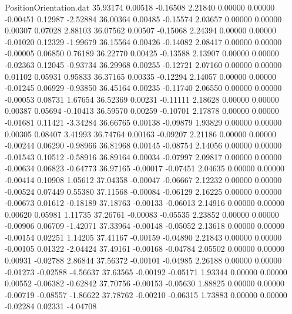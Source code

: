 \begin{filecontents}{PositionOrientation.dat}
  35.93174    0.00518   -0.16508     2.21840    0.00000    0.00000   -0.00451    0.12987   -2.52884
  36.00364    0.00485   -0.15574     2.03657    0.00000    0.00000    0.00307    0.07028    2.88103
  36.07562    0.00507   -0.15068     2.24394    0.00000    0.00000   -0.01020    0.12329   -1.99679
  36.15564    0.00426   -0.14082     2.08417    0.00000    0.00000   -0.00005    0.06850    0.76189
  36.22770    0.00425   -0.13588     2.13907    0.00000    0.00000   -0.02363    0.12045   -0.93734
  36.29968    0.00255   -0.12721     2.07160    0.00000    0.00000    0.01102    0.05931    0.95833
  36.37165    0.00335   -0.12294     2.14057    0.00000    0.00000   -0.01245    0.06929   -0.93850
  36.45164    0.00235   -0.11740     2.06550    0.00000    0.00000   -0.00053    0.08731    1.67654
  36.52369    0.00231   -0.11111     2.18628    0.00000    0.00000    0.00387    0.05694   -0.10413
  36.59570    0.00259   -0.10701     2.17878    0.00000    0.00000   -0.01681    0.11421   -3.34284
  36.66765    0.00138   -0.09879     1.93829    0.00000    0.00000    0.00305    0.08407    3.41993
  36.74764    0.00163   -0.09207     2.21186    0.00000    0.00000   -0.00244    0.06290   -0.98966
  36.81968    0.00145   -0.08754     2.14056    0.00000    0.00000   -0.01543    0.10512   -0.58916
  36.89164    0.00034   -0.07997     2.09817    0.00000    0.00000   -0.00634    0.06823   -0.64773
  36.97165   -0.00017   -0.07451     2.04635    0.00000    0.00000   -0.00414    0.10908    1.05612
  37.04358   -0.00047   -0.06667     2.12232    0.00000    0.00000   -0.00524    0.07449    0.55380
  37.11568   -0.00084   -0.06129     2.16225    0.00000    0.00000   -0.00673    0.01612   -0.18189
  37.18763   -0.00133   -0.06013     2.14916    0.00000    0.00000    0.00620    0.05981    1.11735
  37.26761   -0.00083   -0.05535     2.23852    0.00000    0.00000   -0.00906    0.06709   -1.42071
  37.33964   -0.00148   -0.05052     2.13618    0.00000    0.00000   -0.00154    0.02251    1.14205
  37.41167   -0.00159   -0.04890     2.21843    0.00000    0.00000   -0.00105    0.01322   -2.04424
  37.49161   -0.00168   -0.04784     2.05502    0.00000    0.00000    0.00931   -0.02788    2.86844
  37.56372   -0.00101   -0.04985     2.26188    0.00000    0.00000   -0.01273   -0.02588   -4.56637
  37.63565   -0.00192   -0.05171     1.93344    0.00000    0.00000    0.00552   -0.06382   -0.62842
  37.70756   -0.00153   -0.05630     1.88825    0.00000    0.00000   -0.00719   -0.08557   -1.86622
  37.78762   -0.00210   -0.06315     1.73883    0.00000    0.00000   -0.02284    0.02331   -4.04708

\end{filecontents}
